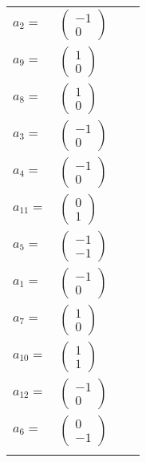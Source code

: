 \documentclass[1p]{elsarticle_modified}
\theoremstyle{definition}
\begin{document}
\begin{tabular}{m{7pt} m{180pt} m{7pt} m{180pt} }
\flushright $a_{2}=$&$\begin{pmatrix}-1\\0\end{pmatrix}$ \\
\flushright $a_{9}=$&$\begin{pmatrix}1\\0\end{pmatrix}$ \\
\flushright $a_{8}=$&$\begin{pmatrix}1\\0\end{pmatrix}$ \\
\flushright $a_{3}=$&$\begin{pmatrix}-1\\0\end{pmatrix}$ \\
\flushright $a_{4}=$&$\begin{pmatrix}-1\\0\end{pmatrix}$ \\
\flushright $a_{11}=$&$\begin{pmatrix}0\\1\end{pmatrix}$ \\
\flushright $a_{5}=$&$\begin{pmatrix}-1\\-1\end{pmatrix}$ \\
\flushright $a_{1}=$&$\begin{pmatrix}-1\\0\end{pmatrix}$ \\
\flushright $a_{7}=$&$\begin{pmatrix}1\\0\end{pmatrix}$ \\
\flushright $a_{10}=$&$\begin{pmatrix}1\\1\end{pmatrix}$ \\
\flushright $a_{12}=$&$\begin{pmatrix}-1\\0\end{pmatrix}$ \\
\flushright $a_{6}=$&$\begin{pmatrix}0\\-1\end{pmatrix}$\\&\end{tabular}
\end{document}
